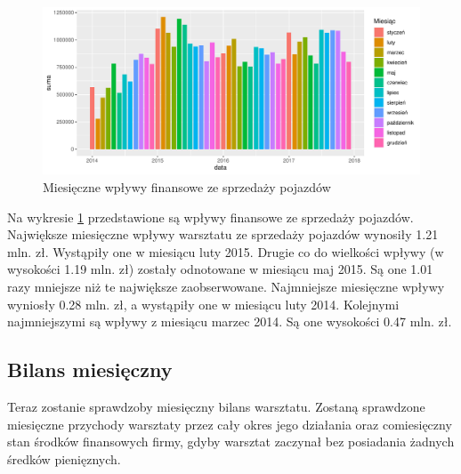\documentclass{article}\usepackage[]{graphicx}\usepackage[]{xcolor}
\makeatletter
\def\maxwidth{ %
  \ifdim\Gin@nat@width>\linewidth
    \linewidth
  \else
    \Gin@nat@width
  \fi
}
\newenvironment{knitrout}{}{} %
\makeatother
\begin{document}
\begin{knitrout}
\color{fgcolor}\begin{figure}[H]

{\centering \includegraphics[width=\maxwidth]{figure/fig_samochody_wplywy-1} 

}

\caption[Miesięczne wpływy finansowe ze sprzedaży pojazdów]{Miesięczne wpływy finansowe ze sprzedaży pojazdów}\label{fig:fig_samochody_wplywy}
\end{figure}

\end{knitrout}

Na wykresie \ref{fig:fig_samochody_wplywy} przedstawione są wpływy finansowe ze sprzedaży pojazdów. 
Największe miesięczne wpływy warsztatu ze sprzedaży pojazdów wynosiły 1.21 mln. zł. Wystąpiły one w miesiącu luty 2015. 
Drugie co do wielkości wpływy (w wysokości 1.19 mln. zł) zostały odnotowane w miesiącu maj 2015. Są one 1.01 razy mniejsze niż te największe zaobserwowane.
Najmniejsze miesięczne wpływy wyniosły 0.28 mln. zł, a wystąpiły one w miesiącu luty 2014.
Kolejnymi najmniejszymi są wpływy z miesiącu marzec 2014. Są one wysokości 0.47 mln. zł.

\subsection{Bilans miesięczny}

Teraz zostanie sprawdzoby miesięczny bilans warsztatu. Zostaną sprawdzone miesięczne przychody warsztaty przez cały okres jego działania oraz comiesięczny stan środków finansowych firmy, gdyby warsztat zaczynał bez posiadania żadnych średków pienięznych.
\end{document}
